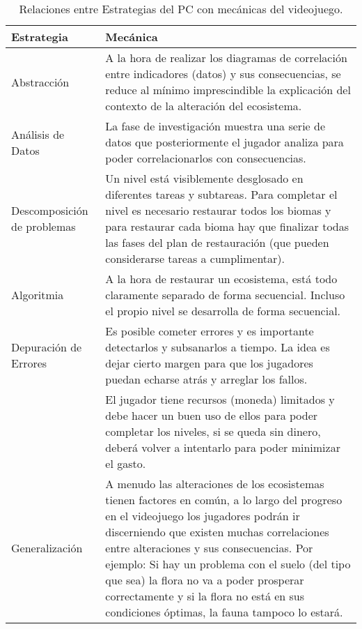 \raggedbottom
\begin{table}[H]
\begin{center}
\setlength{\tabcolsep}{5pt}
\renewcommand{\arraystretch}{1.2}
\begin{tabular}{ | m{8em} | m{30em} | } 
  \hline
  Estrategia & Mecánica \\ 
  \hline
  Abstracción & A la hora de realizar los diagramas de correlación entre indicadores (datos) y sus consecuencias, se reduce al mínimo imprescindible la explicación del contexto de la alteración del ecosistema. \\ 
  \hline
  Análisis de Datos & La fase de investigación muestra una serie de datos que posteriormente el jugador analiza para poder correlacionarlos con consecuencias. \\ 
  \hline
  Descomposición de problemas & Un nivel está visiblemente desglosado en diferentes tareas y subtareas. Para completar el nivel es necesario restaurar todos los biomas y para restaurar cada bioma hay que finalizar todas las fases del plan de restauración (que pueden considerarse tareas a cumplimentar). \\ 
  \hline
  Algoritmia & A la hora de restaurar un ecosistema, está todo claramente separado de forma secuencial. Incluso el propio nivel se desarrolla de forma secuencial. \\ 
  \hline
  Depuración de Errores & Es posible cometer errores y es importante detectarlos y subsanarlos a tiempo. La idea es dejar cierto margen para que los jugadores puedan echarse atrás y arreglar los fallos. \\ 
  \hline
    & El jugador tiene recursos (moneda) limitados y debe hacer un buen uso de ellos para poder completar los niveles, si se queda sin dinero, deberá volver a intentarlo para poder minimizar el gasto. \\ 
  \hline
  Generalización & A menudo las alteraciones de los ecosistemas tienen factores en común, a lo largo del progreso en el videojuego los jugadores podrán ir discerniendo que existen muchas correlaciones entre alteraciones y sus consecuencias. Por ejemplo: Si hay un problema con el suelo (del tipo que sea) la flora no va a poder prosperar correctamente y si la flora no está en sus condiciones óptimas, la fauna tampoco lo estará. \\ 
  \hline
\end{tabular}
\centering
\caption{Relaciones entre Estrategias del PC con mecánicas del videojuego.}
\label{fig:tablaPCMecanicas}
\end{center}
\end{table}


